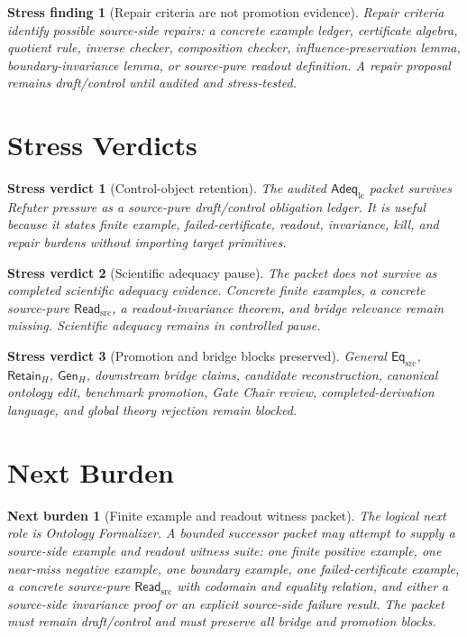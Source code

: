 \documentclass[11pt]{article}
\newcommand{\EqSrc}{\mathsf{Eq}_{\mathrm{src}}}
\newcommand{\ReadSrc}{\mathsf{Read}_{\mathrm{src}}}
\newcommand{\AdeqLC}{\mathsf{Adeq}_{\mathrm{lc}}}
\newcommand{\RetainH}{\mathsf{Retain}_{H}}
\newcommand{\GenH}{\mathsf{Gen}_{H}}
\newtheorem{stressfinding}{Stress finding}
\newtheorem{verdict}{Stress verdict}
\newtheorem{nextburden}{Next burden}
\begin{document}
\begin{stressfinding}[Repair criteria are not promotion evidence]
Repair criteria identify possible source-side repairs: a concrete
example ledger, certificate algebra, quotient rule, inverse checker,
composition checker, influence-preservation lemma, boundary-invariance
lemma, or source-pure readout definition. A repair proposal remains
draft/control until audited and stress-tested.
\end{stressfinding}

\section{Stress Verdicts}

\begin{verdict}[Control-object retention]
The audited \(\AdeqLC\) packet survives Refuter pressure as a
source-pure draft/control obligation ledger. It is useful because it
states finite example, failed-certificate, readout, invariance, kill,
and repair burdens without importing target primitives.
\end{verdict}

\begin{verdict}[Scientific adequacy pause]
The packet does not survive as completed scientific adequacy evidence.
Concrete finite examples, a concrete source-pure \(\ReadSrc\), a
readout-invariance theorem, and bridge relevance remain missing.
Scientific adequacy remains in controlled pause.
\end{verdict}

\begin{verdict}[Promotion and bridge blocks preserved]
General \(\EqSrc\), \(\RetainH\), \(\GenH\), downstream bridge claims,
candidate reconstruction, canonical ontology edit, benchmark promotion,
Gate Chair review, completed-derivation language, and global theory
rejection remain blocked.
\end{verdict}

\section{Next Burden}

\begin{nextburden}[Finite example and readout witness packet]
The logical next role is Ontology Formalizer. A bounded successor packet
may attempt to supply a source-side example and readout witness suite:
one finite positive example, one near-miss negative example, one boundary
example, one failed-certificate example, a concrete source-pure
\(\ReadSrc\) with codomain and equality relation, and either a
source-side invariance proof or an explicit source-side failure result.
The packet must remain draft/control and must preserve all bridge and
promotion blocks.
\end{nextburden}
\end{document}
